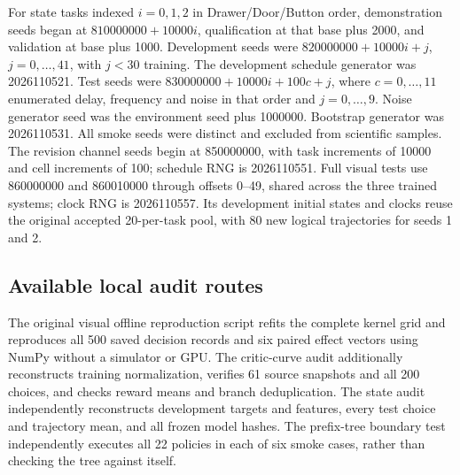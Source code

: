 For state tasks indexed $i=0,1,2$ in Drawer/Door/Button order, demonstration seeds began at $810000000+10000i$, qualification at that base plus 2000, and validation at base plus 1000. Development seeds were $820000000+10000i+j$, $j=0,\ldots,41$, with $j<30$ training. The development schedule generator was 2026110521. Test seeds were $830000000+10000i+100c+j$, where $c=0,\ldots,11$ enumerated delay, frequency and noise in that order and $j=0,\ldots,9$. Noise generator seed was the environment seed plus 1000000. Bootstrap generator was 2026110531. All smoke seeds were distinct and excluded from scientific samples. The revision channel seeds begin at 850000000, with task increments of 10000 and cell increments of 100; schedule RNG is 2026110551. Full visual tests use 860000000 and 860010000 through offsets 0--49, shared across the three trained systems; clock RNG is 2026110557. Its development initial states and clocks reuse the original accepted 20-per-task pool, with 80 new logical trajectories for seeds 1 and 2.

\subsection{Available local audit routes}
The original visual offline reproduction script refits the complete kernel grid and reproduces all 500 saved decision records and six paired effect vectors using NumPy without a simulator or GPU. The critic-curve audit additionally reconstructs training normalization, verifies 61 source snapshots and all 200 choices, and checks reward means and branch deduplication. The state audit independently reconstructs development targets and features, every test choice and trajectory mean, and all frozen model hashes. The prefix-tree boundary test independently executes all 22 policies in each of six smoke cases, rather than checking the tree against itself.

